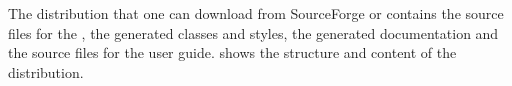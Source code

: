 
The  distribution that one can download from SourceForge or 
contains the source files for the , the generated classes and styles, the generated
documentation and the source files for the user guide.
 shows the structure and content of the  distribution.

